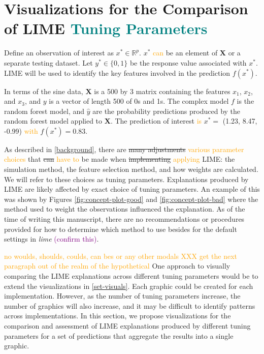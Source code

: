 \documentclass[AMS,STIX2COL]{WileyNJD-v2}\usepackage[]{graphicx}\usepackage[]{color}
\newcommand{\hh}[1]{\textcolor{orange}{#1}}
\newcommand{\kgc}[1]{\textcolor{purple}{#1}}
\newcommand{\kge}[1]{\textcolor{teal}{#1}}
\newcommand{\data}{sine data}
\begin{document}
{\section{Visualizations for the Comparison of LIME \kge{Tuning Parameters}}  \label{implementation-visuals}

Define an observation of interest as $x^*\in\mathbb{R}^p$. $x^*$ \hh{can} be an element of $\textbf{X}$ or a separate testing dataset. Let $y^*\in\{0,1\}$ be the response value associated with $x^*$. %
LIME will be used to identify the key features involved in the prediction $f(x^*)$.

In terms of the \data, $\textbf{X}$ is a 500 by 3 matrix containing the features $x_1$, $x_2$, and $x_3$, and $y$ is a vector of length 500 of 0s and 1s. The complex model $f$ is the random forest model, and $\hat{y}$ are the probability predictions produced by the random forest model applied to $\textbf{X}$. The prediction of interest %
\hh{is} $x^*=$ (1.23, 8.47, -0.99) \hh{with} $f(x^*)=0.83$.


As described in \autoref{background}, there are \sout{many adjustments} \hh{various parameter choices}  that \sout{can} \hh{have to} be made when \sout{implementing} \hh{applying} LIME: the simulation method, the feature selection method, and how weights are calculated.  We will refer to these choices as tuning parameters.
Explanations produced by LIME are likely affected by exact choice of tuning parameters. An example of this was shown by Figures \ref{fig:concept-plot-good} and \ref{fig:concept-plot-bad} where the method used to weight the observations influenced the explanation. As of the time of writing this manuscript, there are no recommendations or procedures provided for how to determine which method to use besides for the default settings in \emph{lime} \kgc{(confirm this)}.

\hh{no woulds, shoulds, coulds, can bes or any other modals XXX get the next paragraph out of the realm of the hypothetical}
One approach to visually comparing the LIME explanations across different tuning parameters would be to extend the visualizations in \autoref{set-visuals}. Each graphic could be created for each implementation. However, as the number of tuning parameters increase, the number of graphics will also increase, and it may be difficult to identify patterns across implementations. In this section, we propose visualizations for the comparison and assessment of LIME explanations produced by different tuning parameters for a set of predictions that aggregate the results into a single graphic.


}
\end{document}
